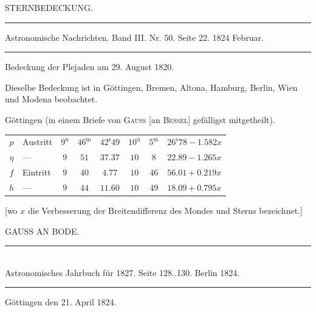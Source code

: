 \clearpage
{}
\hypertarget{native-453-sternbedeckung}{}
\begin{center}
{\large STERNBEDECKUNG.}

\rule{0.75\linewidth}{0.4pt}

Astronomische Nachrichten. Band III. Nr. 50. Seite 22. 1824 Februar.

\rule{0.75\linewidth}{0.4pt}
\end{center}

\begin{center}
Bedeckung der Plejaden am 29. August 1820.
\end{center}

Dieselbe Bedeckung ist in Göttingen, Bremen, Altona, Hamburg, Berlin, Wien und Modena beobachtet.

\begin{center}
Göttingen (in einem Briefe von \textsc{Gauss} [an \textsc{Bessel}] gefälligst mitgetheilt).

\begingroup\small\setlength{\tabcolsep}{4pt}
\begin{tabular}{c l c c c | c c l}
$p$ & Austritt & $9^{\mathrm u}$ & $46^{\mathrm m}$ & $42^{\mathrm s}49$ & $10^{\mathrm u}$ & $5^{\mathrm m}$ & $26^{\mathrm s}78 - 1.582x$ \\
$\eta$ & --- & $9$ & $51$ & $37.37$ & $10$ & $8$ & $22.89 - 1.265x$ \\
$f$ & Eintritt & $9$ & $40$ & $4.77$ & $10$ & $46$ & $56.01 + 0.219x$ \\
$h$ & --- & $9$ & $44$ & $11.60$ & $10$ & $49$ & $18.09 + 0.795x$ \\
\end{tabular}
\endgroup
\end{center}

[wo $x$ die Verbesserung der Breitendifferenz des Mondes und Sterns bezeichnet.]

\clearpage
{}

\begin{center}
{\large GAUSS AN BODE.}
\end{center}

\begin{center}
\rule{6cm}{0.4pt}\\
Astronomisches Jahrbuch für 1827. Seite 128..130. Berlin 1824.\\
\rule{6cm}{0.4pt}
\end{center}

\begin{flushright}
Göttingen den 21. April 1824.
\end{flushright}


